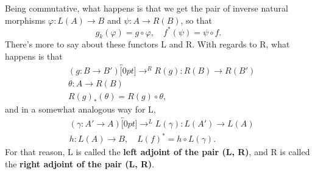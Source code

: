 \documentclass[../category_theory.tex]{subfiles}
\begin{document}
Being commutative, what happens is that we get the pair of inverse natural morphisms \(\varphi :L(A)\rightarrow B\) and \(\psi:A\rightarrow R(B)\), so that
\[
	g_{k}(\varphi )=g\circ \varphi,\quad f^{*}(\psi)=\psi \circ f.
\]
There's more to say about these functors L and R. With regards to R, what happens is that
\begin{align*}
	 & (g:B\rightarrow B')\overbracket[0pt]{\longrightarrow}^{R}R(g):R(B)\rightarrow R(B') \\
	 & \theta:A\rightarrow R(B)                                                            \\
	 & R(g)_{*}(\theta )=R(g)\circ \theta,
\end{align*}
and in a somewhat analogous way for L,
\begin{align*}
	 & (\gamma :A'\rightarrow A)\overbracket[0pt]{\longrightarrow}^{L}L(\gamma ):L(A')\rightarrow L(A) \\
	 & h:L(A)\rightarrow B,\quad L(f)^{*}=h\circ L(\gamma ).
\end{align*}
For that reason, L is called the \textbf{left adjoint of the pair (L, R)}, and R is called the \textbf{right adjoint of the pair (L, R)}.
\end{document}
